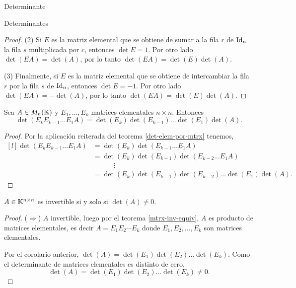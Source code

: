 \begin{chapter}{Determinante}
\begin{section}{Determinantes}
\begin{proof}
        (2) Si $E$ es la matriz elemental que se obtiene de sumar a la fila $r$ de $\operatorname{Id}_n$  la fila $s$ multiplicada por $c$, entonces $\det E =1$. Por  otro lado  $\det(EA) = \det(A)$, por lo tanto  $\det(EA) = \det(E)\det(A)$.

        (3) Finalmente, si $E$ es la matriz elemental que se obtiene de intercambiar la fila $r$ por la fila $s$ de $\operatorname{Id}_n$, entonces $\det E=-1$. Por  otro lado  $\det(EA) = -\det(A)$, por lo tanto  $\det(EA) = \det(E)\det(A)$.
    \end{proof}

    \begin{corolario}\label{coro-det-prod-elem-mtrx}
        Sea $A  \in M_n(\mathbb K)$ y $E_1,\ldots,E_k$ matrices elementales $n \times n$. Entonces
        \begin{equation*}
            \det (E_kE_{k-1}\ldots E_1A) = \det (E_k) \det (E_{k-1})\ldots \det (E_1) \det (A).
        \end{equation*}
    \end{corolario}
    \begin{proof}
        Por  la aplicación reiterada del teorema \ref{det-elem-por-mtrx} tenemos,
        \begin{equation*}
            \begin{matrix*}[l]
                \det (E_kE_{k-1}\ldots E_1A) &= \det (E_k) \det(E_{k-1}\ldots E_1 A) \\
                &= \det( E_k) \det(E_{k-1})\det(E_{k-2}\ldots E_1A) \\
                &\qquad\quad \vdots \\
                & = \det( E_k) \det(E_{k-1})\det(E_{k-2})\ldots \det(E_1) \det(A).
            \end{matrix*}
        \end{equation*}
    \end{proof}

    \begin{teorema}\label{th-det-matriz-invertible}
        $A \in \mathbb K^{n \times n}$ es invertible si y solo si $\det(A) \ne 0$.
    \end{teorema}
    \begin{proof}
        ($\Rightarrow$)  $A$ invertible, luego por el  teorema \ref{mtrx-inv-equiv}, $A$ es producto de matrices elementales, es decir  $A = E_1 E_2 \cdots E_k$  donde $E_1, E_2, \ldots, E_k$ son matrices elementales.

        Por el corolario anterior,  $\det(A) = \det(E_1) \det(E_2) \ldots \det(E_k)$. Como el determinante de matrices elementales es distinto de cero, $$\det(A) = \det(E_1) \det(E_2) \ldots \det(E_k)\ne 0.$$


\end{proof}
\end{section}
\end{chapter}
